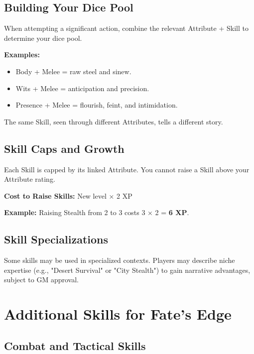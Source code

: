 \section{Building Your Dice Pool}

When attempting a significant action, combine the relevant Attribute + Skill to determine your dice pool.

\textbf{Examples:}
\begin{itemize}
  \item Body + Melee = raw steel and sinew.
  \item Wits + Melee = anticipation and precision.
  \item Presence + Melee = flourish, feint, and intimidation.
\end{itemize}

The same Skill, seen through different Attributes, tells a different story.

\section{Skill Caps and Growth}

Each Skill is capped by its linked Attribute. You cannot raise a Skill above your Attribute rating.

\textbf{Cost to Raise Skills:} New level × 2 XP

\textbf{Example:} Raising Stealth from 2 to 3 costs 3 × 2 = \textbf{6 XP}.

\section{Skill Specializations}

Some skills may be used in specialized contexts. Players may describe niche expertise (e.g., "Desert Survival" or "City Stealth") to gain narrative advantages, subject to GM approval.

\chapter{Additional Skills for Fate's Edge}
\label{ch:additional-skills}

\section{Combat and Tactical Skills}

